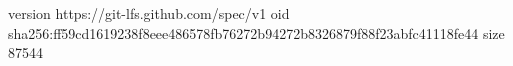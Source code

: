 version https://git-lfs.github.com/spec/v1
oid sha256:ff59cd1619238f8eee486578fb76272b94272b8326879f88f23abfc41118fe44
size 87544
